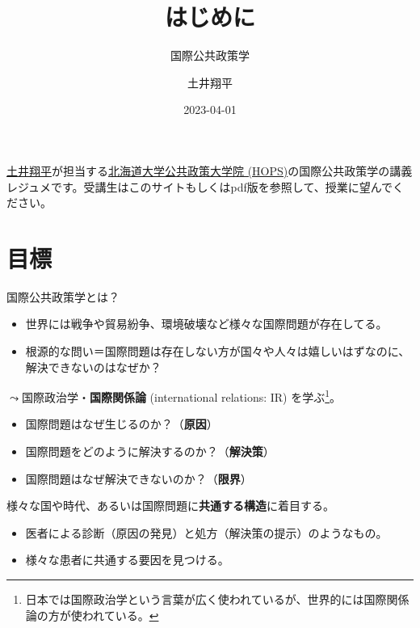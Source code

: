 \documentclass[
  xelatex,
  ja=standard]{bxjsarticle}
\title{はじめに}
\subtitle{国際公共政策学}
\author{土井翔平}
\date{2023-04-01}
\providecommand{\tightlist}{%
  \setlength{\itemsep}{0pt}\setlength{\parskip}{0pt}}\usepackage{longtable,booktabs,array}
\begin{document}
\maketitle
\ifdefined\Shaded\renewenvironment{Shaded}{\begin{tcolorbox}[breakable, interior hidden, frame hidden, borderline west={3pt}{0pt}{shadecolor}, sharp corners, boxrule=0pt, enhanced]}{\end{tcolorbox}}\fi

\href{https://shohei-doi.github.io}{土井翔平}が担当する\href{https://www.hops.hokudai.ac.jp/}{北海道大学公共政策大学院
(HOPS)}の国際公共政策学の講義レジュメです。受講生はこのサイトもしくはpdf版を参照して、授業に望んでください。

\hypertarget{ux76eeux6a19}{%
\section{目標}\label{ux76eeux6a19}}

国際公共政策学とは？

\begin{itemize}
\tightlist
\item
  世界には戦争や貿易紛争、環境破壊など様々な国際問題が存在してる。
\item
  根源的な問い＝国際問題は存在しない方が国々や人々は嬉しいはずなのに、解決できないのはなぜか？
\end{itemize}

\(\leadsto\)国際政治学・\textbf{国際関係論} (international relations:
IR) を学ぶ\footnote{日本では国際政治学という言葉が広く使われているが、世界的には国際関係論の方が使われている。}。

\begin{itemize}
\tightlist
\item
  国際問題はなぜ生じるのか？（\textbf{原因}）
\item
  国際問題をどのように解決するのか？（\textbf{解決策}）
\item
  国際問題はなぜ解決できないのか？（\textbf{限界}）
\end{itemize}

様々な国や時代、あるいは国際問題に\textbf{共通する構造}に着目する。

\begin{itemize}
\tightlist
\item
  医者による診断（原因の発見）と処方（解決策の提示）のようなもの。
\item
  様々な患者に共通する要因を見つける。
\end{itemize}
\end{document}
